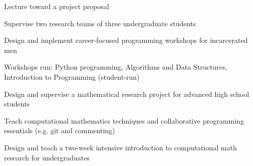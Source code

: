 \documentclass[letterpaper]{rennie-resume} %
\begin{document}
\sectionspace



  \begin{tightitemize}
    \item Lecture toward a project proposal
    \item Supervise two research teams of three undergraduate students
  \end{tightitemize}

  \sectionspace
\begin{tightitemize}
\item Design and implement career-focused programming workshops for incarcerated men
\item Workshops run: Python programming, Algorithms and Data Structures, Introduction to Programming (student-run)
\end{tightitemize}

\sectionspace 
{}
\begin{tightitemize}
\item Design and supervise a mathematical research project for advanced high school students
\item Teach computational mathematics techniques and collaborative programming essentials (e.g. git and commenting)
\end{tightitemize}

\sectionspace 
{}

\begin{tightitemize}
\item Design and teach a two-week intensive introduction to computational math research for undergraduates
\end{tightitemize}
\end{document}
